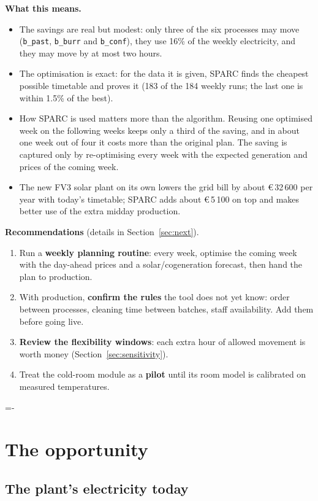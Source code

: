 \documentclass[10pt,a4paper]{scrartcl}
\makeatletter
\newcommand{\Eur}[1]{\euro\,#1}
\renewcommand{\emph}[1]{\textcolor{accent}{#1}}
\newcommand{\NeedSpace}[1]{\par\begingroup\dimen@=\pagegoal\advance\dimen@-\pagetotal
    \ifdim\dimen@<#1\relax\newpage\fi\endgroup}
\newcommand{\RuleSection}[1]{%
    \NeedSpace{10\baselineskip}%
    \section{#1}%
    \vspace{0.2em}{\color{accent!35}\hrule height 0.4pt}\vspace{0.3em}%
  }
\makeatother
\begin{document}
  \textbf{What this means.}
  \begin{itemize}
    \item The savings are \emph{real but modest}: only three of the six processes may move
      (\texttt{b\_past}, \texttt{b\_burr} and \texttt{b\_conf}), they use 16\% of
      the weekly electricity, and they may move by at most two hours.
    \item The optimisation is \emph{exact}: for the data it is given, SPARC finds the cheapest
      possible timetable and proves it (183 of the 184 weekly runs; the last one is within 1.5\% of
      the best).
    \item \emph{How SPARC is used matters more than the algorithm.} Reusing one optimised week on
      the following weeks keeps only a third of the saving, and in about one week out of four it
      costs more than the original plan. The saving is captured only by re-optimising every week
      with the expected generation and prices of the coming week.
    \item The new FV3 solar plant on its own lowers the grid bill by about \Eur{32\,600} per year
      with today's timetable; SPARC adds about \Eur{5\,100} on top and makes better use of the extra
      midday production.
  \end{itemize}

  \textbf{Recommendations} (details in Section~\ref{sec:next}).
  \begin{enumerate}
    \item Run a \textbf{weekly planning routine}: every week, optimise the coming week with the
      day-ahead prices and a solar/cogeneration forecast, then hand the plan to production.
    \item With production, \textbf{confirm the rules} the tool does not yet know: order between
      processes, cleaning time between batches, staff availability. Add them before going live.
    \item \textbf{Review the flexibility windows}: each extra hour of allowed movement is worth
      money (Section~\ref{sec:sensitivity}).
    \item Treat the cold-room module as a \textbf{pilot} until its room model is calibrated on
      measured temperatures.
  \end{enumerate}

  \RuleSection{The opportunity}
  \label{sec:opportunity}

  \subsection{The plant's electricity today}
\end{document}
